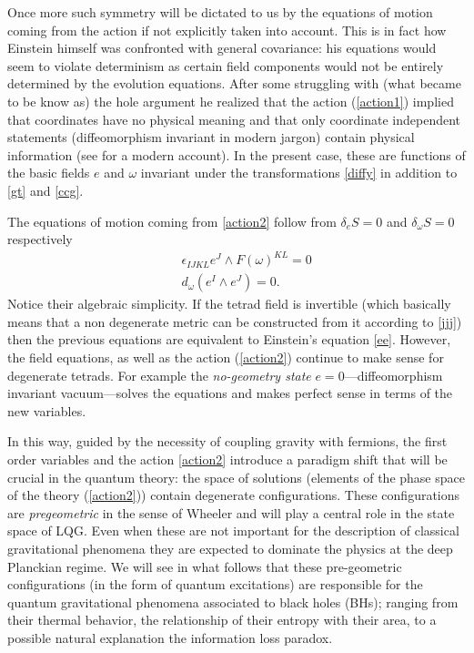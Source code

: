\documentclass[aps, nofootinbib,superscriptaddress,12pt]{revtex4-2}
\def\ba{\begin{eqnarray}}
\def\ea{\end{eqnarray}}
\begin{document}
 Once more such symmetry will be dictated to us by the equations of motion coming from the action if not explicitly taken into account.
 This is in fact how Einstein himself was confronted with general covariance: his equations would seem to violate determinism as certain field components 
 would not be entirely determined by the evolution equations. After some struggling with (what became to be know as) the hole argument he 
 realized that the action (\ref{action1}) implied that coordinates have no physical meaning and that only coordinate independent  statements (diffeomorphism invariant in modern jargon) contain physical information (see \cite{Rovelli:2004tv} for a modern account). In the present case, these are functions of the basic fields $e$ and $\omega$ invariant under the transformations \eqref{diffy} in addition to  
 \eqref{gt} and \eqref{ccg}.
 
 The equations of motion coming from \eqref{action2} follow from $\delta_e S=0$ and $\delta_\omega S=0$ respectively
 \ba\label{eom}
&&  \epsilon_{IJKL} e^J \wedge F(\omega)^{KL}=0 \\ 
 && d_{\omega}(e^I\wedge e^J)=0. \label{eom2}
 \ea
Notice their algebraic simplicity. If the tetrad field is invertible (which basically means that a non degenerate metric can be constructed from it according to  \eqref{jjj}) then the previous equations are equivalent to Einstein's equation \eqref{ee}.  However, the field equations, as well as the action (\ref{action2}) continue to make sense for degenerate tetrads. For example the {\em no-geometry state}  $e=0$---diffeomorphism invariant vacuum---solves the equations and makes perfect sense in terms of the new variables. 
 
In this way, guided by the necessity of coupling gravity with fermions, the first order variables and the action \eqref{action2} introduce a paradigm shift that will be crucial in the quantum theory:  the space of solutions (elements of the phase space of the theory (\ref{action2})) contain degenerate configurations. These configurations are {\em pregeometric} in the sense of Wheeler \cite{Misner:1974qy} and will play a central role in the state space of LQG. Even when these are not important for the description of classical gravitational phenomena they are expected to dominate the physics at the deep Planckian regime. We will see in what follows that these pre-geometric configurations (in the form of quantum excitations) are responsible for the quantum gravitational phenomena associated to black holes (BHs); ranging from their thermal behavior, the relationship of their entropy with their area, to a possible natural explanation the information loss paradox.    
\end{document}
